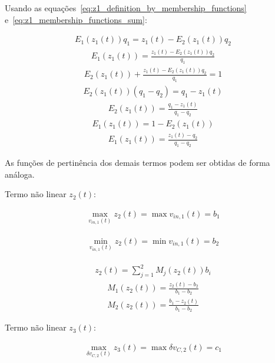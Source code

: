 Usando as equações~\ref{eq:z1_definition_by_membership_functions} e~\ref{eq:z1_membership_functions_sum}:

\begin{gather*}
    E_1(z_1(t))q_1 = z_1(t) - E_2(z_1(t))q_2
\end{gather*}
\begin{gather*}
    E_1(z_1(t)) = \frac{z_1(t) - E_2(z_1(t))q_2}{q_1}
\end{gather*}
\begin{gather*}
    E_2(z_1(t)) + \frac{z_1(t) - E_2(z_1(t))q_2}{q_1} = 1
\end{gather*}
\begin{gather*}
    E_2(z_1(t))\left(q_1 - q_2 \right) = q_1 - z_1(t)
\end{gather*}
\begin{gather}
    E_2(z_1(t)) = \frac{q_1 - z_1(t)}{q_1 - q_2}
\end{gather}
\begin{gather*}
    E_1(z_1(t)) = 1 - E_2(z_1(t))
\end{gather*}
\begin{gather}
    E_1(z_1(t)) = \frac{z_1(t) - q_2}{q_1 - q_2}
\end{gather}

As funções de pertinência dos demais termos podem ser obtidas de forma análoga.

Termo não linear $z_2(t)$:

\begin{gather*}
    \max_{ v_{in,1}(t)} z_2(t) = \max v_{in,1}(t) = b_1
\end{gather*}

\begin{gather}
    \min_{ v_{in,1}(t)} z_2(t) = \min v_{in,1}(t) = b_2
\end{gather}

\begin{gather*}
    z_2(t) = \sum\limits_{j=1}^{2} M_j(z_2(t))b_i
\end{gather*}
\begin{gather}
    M_1(z_2(t)) = \frac{z_2(t) - b_2}{b_1 - b_2}
\end{gather}
\begin{gather}
    M_2(z_2(t)) = \frac{b_1 - z_2(t)}{b_1 - b_2}
\end{gather}

Termo não linear $z_3(t)$:

\begin{gather*}
    \max_{\delta v_{C,2}(t)} z_3(t) = \max \delta v_{C,2}(t) = c_1
\end{gather*}

